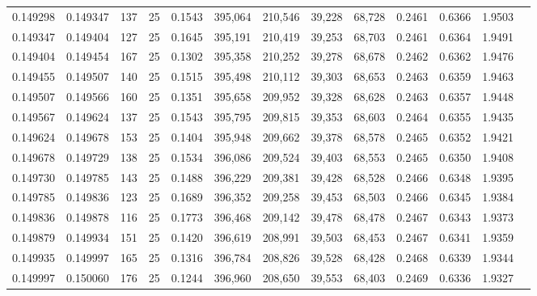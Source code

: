 \begin{tabular}{rrrrrrrrrrrrr}
0.149298 & 0.149347 &   137 &  25 &                                     0.1543 & 395,064 & 210,546 &  39,228 &  68,728 & 0.2461 & 0.6366 & 1.9503 \\
0.149347 & 0.149404 &   127 &  25 &                                     0.1645 & 395,191 & 210,419 &  39,253 &  68,703 & 0.2461 & 0.6364 & 1.9491 \\
0.149404 & 0.149454 &   167 &  25 &                                     0.1302 & 395,358 & 210,252 &  39,278 &  68,678 & 0.2462 & 0.6362 & 1.9476 \\
0.149455 & 0.149507 &   140 &  25 &                                     0.1515 & 395,498 & 210,112 &  39,303 &  68,653 & 0.2463 & 0.6359 & 1.9463 \\
0.149507 & 0.149566 &   160 &  25 &                                     0.1351 & 395,658 & 209,952 &  39,328 &  68,628 & 0.2463 & 0.6357 & 1.9448 \\
0.149567 & 0.149624 &   137 &  25 &                                     0.1543 & 395,795 & 209,815 &  39,353 &  68,603 & 0.2464 & 0.6355 & 1.9435 \\
0.149624 & 0.149678 &   153 &  25 &                                     0.1404 & 395,948 & 209,662 &  39,378 &  68,578 & 0.2465 & 0.6352 & 1.9421 \\
0.149678 & 0.149729 &   138 &  25 &                                     0.1534 & 396,086 & 209,524 &  39,403 &  68,553 & 0.2465 & 0.6350 & 1.9408 \\
0.149730 & 0.149785 &   143 &  25 &                                     0.1488 & 396,229 & 209,381 &  39,428 &  68,528 & 0.2466 & 0.6348 & 1.9395 \\
0.149785 & 0.149836 &   123 &  25 &                                     0.1689 & 396,352 & 209,258 &  39,453 &  68,503 & 0.2466 & 0.6345 & 1.9384 \\
0.149836 & 0.149878 &   116 &  25 &                                     0.1773 & 396,468 & 209,142 &  39,478 &  68,478 & 0.2467 & 0.6343 & 1.9373 \\
0.149879 & 0.149934 &   151 &  25 &                                     0.1420 & 396,619 & 208,991 &  39,503 &  68,453 & 0.2467 & 0.6341 & 1.9359 \\
0.149935 & 0.149997 &   165 &  25 &                                     0.1316 & 396,784 & 208,826 &  39,528 &  68,428 & 0.2468 & 0.6339 & 1.9344 \\
0.149997 & 0.150060 &   176 &  25 &                                     0.1244 & 396,960 & 208,650 &  39,553 &  68,403 & 0.2469 & 0.6336 & 1.9327 \\

\end{tabular}
